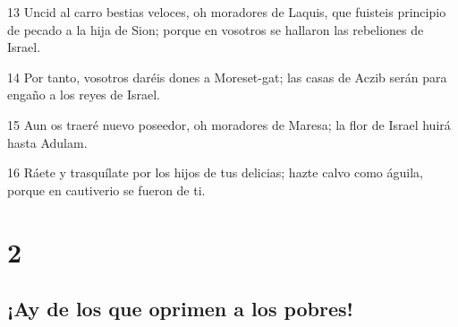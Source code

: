 \par 13 Uncid al carro bestias veloces, oh moradores de Laquis, que fuisteis principio de pecado a la hija de Sion; porque en vosotros se hallaron las rebeliones de Israel.
\par 14 Por tanto, vosotros daréis dones a Moreset-gat; las casas de Aczib serán para engaño a los reyes de Israel.
\par 15 Aun os traeré nuevo poseedor, oh moradores de Maresa; la flor de Israel huirá hasta Adulam.
\par 16 Ráete y trasquílate por los hijos de tus delicias; hazte calvo como águila, porque en cautiverio se fueron de ti.

\chapter{2}

\section*{¡Ay de los que oprimen a los pobres!}

